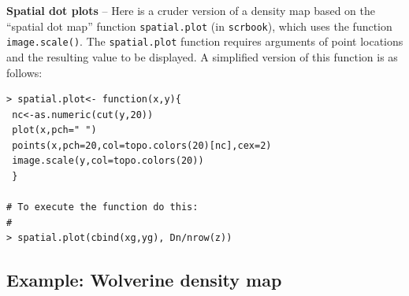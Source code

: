 {\bf Spatial dot plots } -- Here is a cruder version of a density map based on the
``spatial dot map'' function \mbox{\tt spatial.plot} (in
\mbox{\tt scrbook}), which uses
the function \mbox{\tt image.scale()}.
The \mbox{\tt spatial.plot} function requires arguments of point
locations and the resulting value to be displayed. A simplified
version of this function is as follows:
\begin{verbatim}
> spatial.plot<- function(x,y){
 nc<-as.numeric(cut(y,20))
 plot(x,pch=" ")
 points(x,pch=20,col=topo.colors(20)[nc],cex=2)
 image.scale(y,col=topo.colors(20))
 }

# To execute the function do this:
#
> spatial.plot(cbind(xg,yg), Dn/nrow(z))
\end{verbatim}

\subsection{Example: Wolverine density map}

